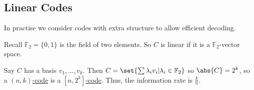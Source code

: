 \documentclass{article}
\newcommand{\F}{\mathbb{F}}
\newcommand{\1}[1]{\mathbbm{1}_{#1}}
\begin{document}
\subsection{Linear Codes}
In practise we consider codes with extra structure to allow efficient decoding.
Recall $\F_2 = \{0, 1\}$ is the field of two elements. So $C$ is linear if it is a $\F_2$-vector space.
Say $C$ has a basis $v_1, \dotsc, v_k$.
Then $C = \set{\sum \lambda_i v_i | \lambda_i \in \F_2}$ so $\abs{C} = 2^k$, so a \hyperlink{def:nkcode}{$(n, k)$-code} is a \hyperlink{def:binaryCode}{$[n, 2^k]$-code}.
Thus, the information rate is $\frac{k}{n}$.
\end{document}
